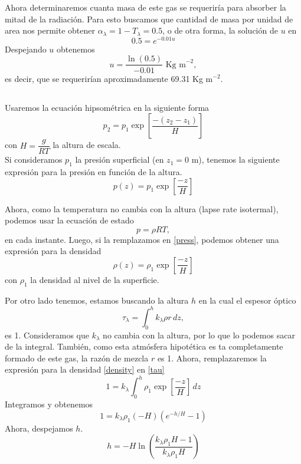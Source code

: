 \documentclass{tarea}
\begin{document}
Ahora determinaremos cuanta masa de este gas se requeriría para absorber la mitad de la radiación. Para esto buscamos que cantidad de masa por unidad de area nos permite obtener $\alpha_\lambda = 1 - T_\lambda = 0.5$, o de otra forma, la solución de $u$ en 
$$ 0.5 = e^{-0.01 u} $$
Despejando $u$ obtenemos
$$u = \dfrac{\ln(0.5)}{-0.01} \text{ Kg m}^{-2},$$
es decir, que se requerirían aproximadamente 69.31 Kg m$^{-2}$.

\setcounter{subsection}{45}
\subsection{}

Usaremos la ecuación hipsométrica en la siguiente forma
\begin{equation}
    p_2 = p_1 \exp \left[\dfrac{-(z_2-z_1)}{H}\right] \nonumber
\end{equation}
con $H = \dfrac{g}{RT}$ la altura de escala.\\

Si consideramos $p_1$ la presión superficial (en $z_{1} = 0$ m), tenemos la siguiente expresión para la presión en función de la altura.
\begin{equation}
    p(z) = p_1 \exp \left[\dfrac{-z}{H}\right] \label{press}
\end{equation}

Ahora, como la temperatura no cambia con la altura (lapse rate isotermal), podemos usar la ecuación de estado 
$$p = \rho RT,$$
en cada instante. Luego, si la remplazamos en \eqref{press}, podemos obtener una expresión para la densidad
\begin{equation}
    \rho(z) = \rho_1 \exp \left[\dfrac{-z}{H}\right] \label{density}
\end{equation}
con $\rho_1$ la densidad al nivel de la superficie.

Por otro lado tenemos, estamos buscando la altura $h$ en la cual el espesor óptico
\begin{equation}
\tau_\lambda = \int_0^{h}  k_\lambda \rho r \, dz, \label{tau}
\end{equation}
es 1.
Consideramos que $k_\lambda$ no cambia con la altura, por lo que lo podemos sacar de la integral. También, como esta atmósfera hipotética es ta completamente formado de este gas, la razón de mezcla $r$ es 1. 
Ahora, remplazaremos la expresión para la densidad \eqref{density} en \eqref{tau}
$$1 = k_\lambda \int_0^{h} \rho_1 \exp \left[\dfrac{-z}{H}\right] \, dz$$
Integramos y obtenemos
$$1 = k_\lambda \rho_1 (-H) \left( e^{-h/H} - 1 \right) $$
Ahora, despejamos $h$.
\begin{equation}
h = -H \ln \left( \frac{k_\lambda \rho_1 H -1}{k_\lambda \rho_1 H} \right) \label{h}
\end{equation}
\end{document}
